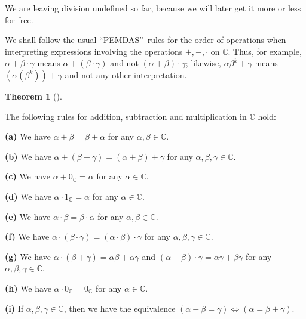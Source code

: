 \documentclass[numbers=enddot,12pt,final,onecolumn,notitlepage]{scrartcl}%
\numberwithin{exer}{subsection}
\theoremstyle{definition}
\newtheorem{theo}{Theorem}[subsection]
\newenvironment{theorem}[1][]
{\begin{theo}[#1]\begin{leftbar}}
{\end{leftbar}\end{theo}}
\begin{document}
We are leaving division undefined so far, because we will later get it more or
less for free.

We shall follow \href{https://en.wikipedia.org/wiki/Order_of_operations}{the
usual \textquotedblleft PEMDAS\textquotedblright\ rules for the order of
operations} when interpreting expressions involving the operations $+,-,\cdot$
on $\mathbb{C}$. Thus, for example, $\alpha+\beta\cdot\gamma$ means
$\alpha+\left(  \beta\cdot\gamma\right)  $ and not $\left(  \alpha
+\beta\right)  \cdot\gamma$; likewise, $\alpha\beta^{k}+\gamma$ means $\left(
\alpha\left(  \beta^{k}\right)  \right)  +\gamma$ and not any other interpretation.

\begin{theorem}
\label{thm.CC.CC.rules}The following rules for addition, subtraction and
multiplication in $\mathbb{C}$ hold:

\textbf{(a)} We have $\alpha+\beta=\beta+\alpha$ for any $\alpha,\beta
\in\mathbb{C}$.

\textbf{(b)} We have $\alpha+\left(  \beta+\gamma\right)  =\left(
\alpha+\beta\right)  +\gamma$ for any $\alpha,\beta,\gamma\in\mathbb{C}$.

\textbf{(c)} We have $\alpha+0_{\mathbb{C}}=\alpha$ for any $\alpha
\in\mathbb{C}$.

\textbf{(d)} We have $\alpha\cdot1_{\mathbb{C}}=\alpha$ for any $\alpha
\in\mathbb{C}$.

\textbf{(e)} We have $\alpha\cdot\beta=\beta\cdot\alpha$ for any $\alpha
,\beta\in\mathbb{C}$.

\textbf{(f)} We have $\alpha\cdot\left(  \beta\cdot\gamma\right)  =\left(
\alpha\cdot\beta\right)  \cdot\gamma$ for any $\alpha,\beta,\gamma
\in\mathbb{C}$.

\textbf{(g)} We have $\alpha\cdot\left(  \beta+\gamma\right)  =\alpha
\beta+\alpha\gamma$ and $\left(  \alpha+\beta\right)  \cdot\gamma=\alpha
\gamma+\beta\gamma$ for any $\alpha,\beta,\gamma\in\mathbb{C}$.

\textbf{(h)} We have $\alpha\cdot0_{\mathbb{C}}=0_{\mathbb{C}}$ for any
$\alpha\in\mathbb{C}$.

\textbf{(i)} If $\alpha,\beta,\gamma\in\mathbb{C}$, then we have the
equivalence $\left(  \alpha-\beta=\gamma\right)  \Longleftrightarrow\left(
\alpha=\beta+\gamma\right)  $.
\end{theorem}
\end{document}
